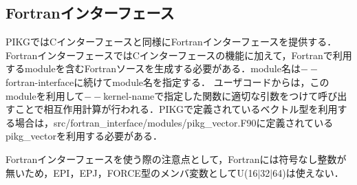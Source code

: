 \documentclass{article}
\begin{document}
\subsection{Fortranインターフェース}
PIKGではCインターフェースと同様にFortranインターフェースを提供する．
FortranインターフェースではCインターフェースの機能に加えて，Fortranで利用するmoduleを含むFortranソースを生成する必要がある．module名は$--$fortran-interfaceに続けてmodule名を指定する．
ユーザコードからは，このmoduleを利用して$--$kernel-nameで指定した関数に適切な引数をつけて呼び出すことで相互作用計算が行われる．PIKGで定義されているベクトル型を利用する場合は，src/fortran\_interface/modules/pikg\_vector.F90に定義されているpikg\_vectorを利用する必要がある．

Fortranインターフェースを使う際の注意点として，Fortranには符号なし整数が無いため，EPI，EPJ，FORCE型のメンバ変数としてU(16$|$32$|$64)は使えない．
\end{document}
